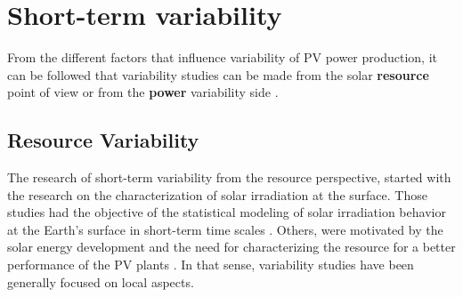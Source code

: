 \section{Short-term variability}%


From the different factors that influence variability of PV power production, it can be followed that variability studies can be made from the solar \textbf{resource} point of view or from the \textbf{power} variability side \cite*{Widen2015}.

\subsection{Resource Variability}


The research of short-term variability from the resource perspective, started with the research on the characterization of solar irradiation at the surface. Those studies had the objective of the statistical modeling of solar irradiation behavior at the Earth's surface in short-term time scales \cite*{Liu1960}. Others, were motivated by the solar energy development and the need for characterizing the resource for a better performance of the PV plants \cite*{Collares-Pereira1979}. In that sense, variability studies have been generally focused on local aspects.

